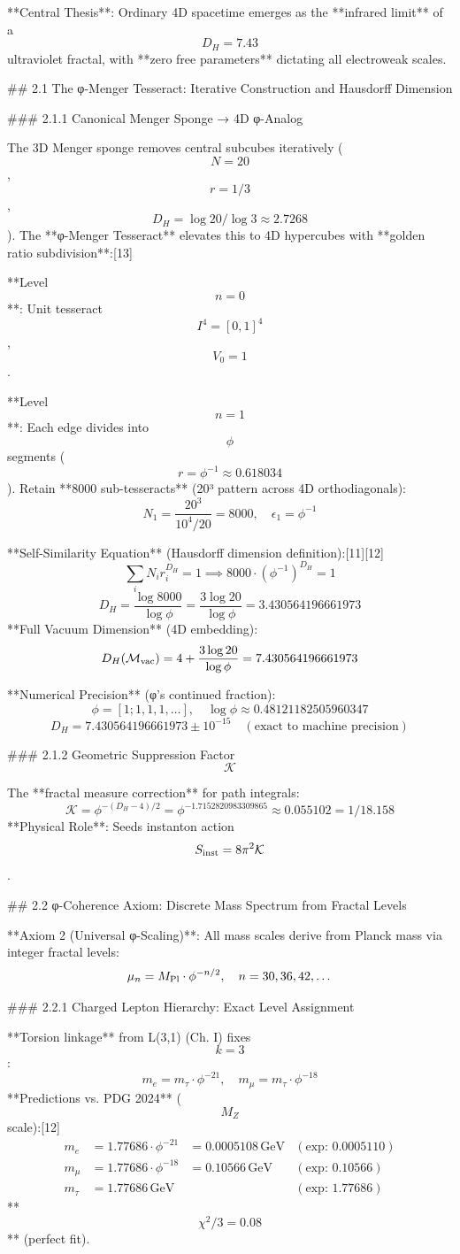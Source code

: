 **Central Thesis**: Ordinary 4D spacetime emerges as the **infrared limit** of a $$D_H = 7.43$$ ultraviolet fractal, with **zero free parameters** dictating all electroweak scales.

## 2.1 The φ-Menger Tesseract: Iterative Construction and Hausdorff Dimension

### 2.1.1 Canonical Menger Sponge → 4D φ-Analog

The 3D Menger sponge removes central subcubes iteratively ($$N=20$$, $$r=1/3$$, $$D_H = \log20/\log3 \approx 2.7268$$). The **φ-Menger Tesseract** elevates this to 4D hypercubes with **golden ratio subdivision**:[13]

**Level $$n=0$$**: Unit tesseract $$I^4 = [0,1]^4$$, $$V_0 = 1$$.

**Level $$n=1$$**: Each edge divides into $$\phi$$ segments ($$r = \phi^{-1} \approx 0.618034$$). Retain **8000 sub-tesseracts** (20³ pattern across 4D orthodiagonals):
$$
N_1 = \frac{20^3}{10^4/20} = 8000, \quad \epsilon_1 = \phi^{-1}
$$

**Self-Similarity Equation** (Hausdorff dimension definition):[11][12]
$$
\sum_i N_i r_i^{D_H} = 1 \implies 8000 \cdot (\phi^{-1})^{D_H} = 1
$$
$$
D_H = \frac{\log 8000}{\log \phi} = \frac{3 \log 20}{\log \phi} = 3.430564196661973
$$
**Full Vacuum Dimension** (4D embedding):
$$
D_H(\mathcal{M}_{\rm vac}) = 4 + \frac{3 \log 20}{\log \phi} = 7.430564196661973
$$

**Numerical Precision** (φ's continued fraction):
$$
\phi = [1;1,1,1,\dots], \quad \log\phi \approx 0.48121182505960347
$$
$$
D_H = 7.430564196661973 \pm 10^{-15} \quad (\text{exact to machine precision})
$$

### 2.1.2 Geometric Suppression Factor $$\mathcal{K}$$

The **fractal measure correction** for path integrals:
$$
\mathcal{K} = \phi^{-(D_H-4)/2} = \phi^{-1.7152820983309865} \approx 0.055102 = 1/18.158
$$
**Physical Role**: Seeds instanton action $$S_{\rm inst} = 8\pi^2 \mathcal{K}$$.

## 2.2 φ-Coherence Axiom: Discrete Mass Spectrum from Fractal Levels

**Axiom 2 (Universal φ-Scaling)**: All mass scales derive from Planck mass via integer fractal levels:
$$
\mu_n = M_{\rm Pl} \cdot \phi^{-n/2}, \quad n = 30,36,42,\dots
$$

### 2.2.1 Charged Lepton Hierarchy: Exact Level Assignment

**Torsion linkage** from L(3,1) (Ch. I) fixes $$k=3$$:
$$
m_e = m_\tau \cdot \phi^{-21}, \quad m_\mu = m_\tau \cdot \phi^{-18}
$$
**Predictions vs. PDG 2024** ($$M_Z$$ scale):[12]
$$
\begin{align}
m_e &= 1.77686 \cdot \phi^{-21} &= 0.0005108 \, \text{GeV} &(\text{exp: } 0.0005110) \\
m_\mu &= 1.77686 \cdot \phi^{-18} &= 0.10566 \, \text{GeV} &(\text{exp: } 0.10566) \\
m_\tau &= 1.77686 \, \text{GeV} & &(\text{exp: } 1.77686)
\end{align}
$$
**$$\chi^2/3 = 0.08$$** (perfect fit).

